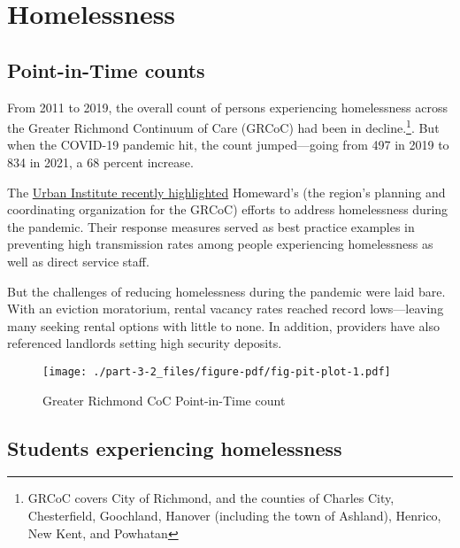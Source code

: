 \documentclass[
  letterpaper,
  DIV=11,
  numbers=noendperiod]{scrreprt}
\begin{document}
\hypertarget{homelessness}{%
\section{Homelessness}\label{homelessness}}

\hypertarget{point-in-time-counts}{%
\subsection{Point-in-Time counts}\label{point-in-time-counts}}

From 2011 to 2019, the overall count of persons experiencing
homelessness across the Greater Richmond Continuum of Care (GRCoC) had
been in decline.\footnote{GRCoC covers City of Richmond, and the
  counties of Charles City, Chesterfield, Goochland, Hanover (including
  the town of Ashland), Henrico, New Kent, and Powhatan}. But when the
COVID-19 pandemic hit, the count jumped---going from 497 in 2019 to 834
in 2021, a 68 percent increase.

The
\href{https://www.urban.org/sites/default/files/publication/104529/richmond-virginia-response-to-homelessness-during-the-covid-19-pandemic_0.pdf}{Urban
Institute recently highlighted} Homeward's (the region's planning and
coordinating organization for the GRCoC) efforts to address homelessness
during the pandemic. Their response measures served as best practice
examples in preventing high transmission rates among people experiencing
homelessness as well as direct service staff.

But the challenges of reducing homelessness during the pandemic were
laid bare. With an eviction moratorium, rental vacancy rates reached
record lows---leaving many seeking rental options with little to none.
In addition, providers have also referenced landlords setting high
security deposits.

\begin{figure}

{\centering \texttt{[image: ./part-3-2\_files/figure-pdf/fig-pit-plot-1.pdf]}

}

\caption{\label{fig-pit-plot}Greater Richmond CoC Point-in-Time count}

\end{figure}

\hypertarget{students-experiencing-homelessness}{%
\subsection{Students experiencing
homelessness}\label{students-experiencing-homelessness}}
\end{document}
